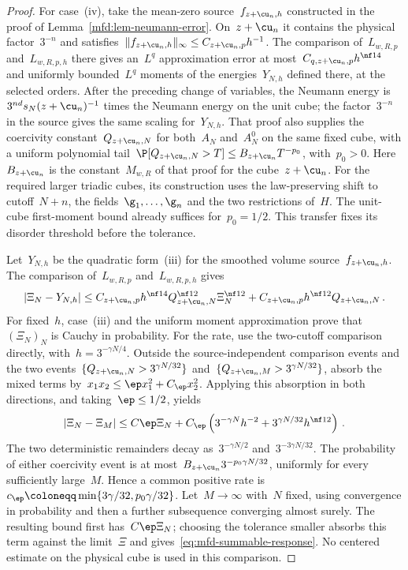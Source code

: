 \documentclass[11pt]{amsart}
\begin{document}
\begin{proof}
For case~(iv), take the mean-zero source~$f_{z+\cu_n,h}$ constructed in the proof of Lemma~\ref{mfd:lem-neumann-error}. On~$z+\cu_n$ it contains the physical factor~$3^{-n}$ and satisfies~$\|f_{z+\cu_n,h}\|_\infty\leq C_{z+\cu_n,p}h^{-1}$. The comparison of~$L_{w,R,p}$ and~$L_{w,R,p,h}$ there gives an~$L^q$ approximation error at most~$C_{q,z+\cu_n,p}h^{\nf14}$ and uniformly bounded~$L^q$ moments of the energies~$Y_{N,h}$ defined there, at the selected orders. After the preceding change of variables, the Neumann energy is~$3^{nd}s_N(z+\cu_n)^{-1}$ times the Neumann energy on the unit cube; the factor~$3^{-n}$ in the source gives the same scaling for~$Y_{N,h}$. That proof also supplies the coercivity constant~$Q_{z+\cu_n,N}$ for both~$A_N$ and~$A_N^0$ on the same fixed cube, with a uniform polynomial tail~$\P[Q_{z+\cu_n,N}>T]\leq B_{z+\cu_n}T^{-p_0}$, with~$p_0>0$. Here~$B_{z+\cu_n}$ is the constant~$M_{w,R}$ of that proof for the cube~$z+\cu_n$. For the required larger triadic cubes, its construction uses the law-preserving shift to cutoff~$N+n$, the fields~$\g_1,\dots,\g_n$ and the two restrictions of~$H$. The unit-cube first-moment bound already suffices for~$p_0=1/2$. This transfer fixes its disorder threshold before the tolerance.

\smallskip

Let~$Y_{N,h}$ be the quadratic form~(iii) for the smoothed volume source~$f_{z+\cu_n,h}$. The comparison of~$L_{w,R,p}$ and~$L_{w,R,p,h}$ gives
\begin{equation*}
	|\Xi_N-Y_{N,h}|
	\leq C_{z+\cu_n,p}h^{\nf14}Q_{z+\cu_n,N}^{\nf12}\Xi_N^{\nf12}
	+C_{z+\cu_n,p}h^{\nf12}Q_{z+\cu_n,N}\,.
\end{equation*}
For fixed~$h$, case~(iii) and the uniform moment approximation prove that~$(\Xi_N)_N$ is Cauchy in probability. For the rate, use the two-cutoff comparison directly, with~$h=3^{-\gamma N/4}$. Outside the source-independent comparison events and the two events~$\{Q_{z+\cu_n,N}>3^{\gamma N/32}\}$ and~$\{Q_{z+\cu_n,M}>3^{\gamma N/32}\}$, absorb the mixed terms by~$x_1x_2\leq\ep x_1^2+C_\ep x_2^2$. Applying this absorption in both directions, and taking~$\ep\leq1/2$, yields
\begin{equation*}
	|\Xi_N-\Xi_M|
	\leq C\ep \Xi_N+
	C_\ep
	\left(3^{-\gamma N}h^{-2}+3^{\gamma N/32}h^{\nf12}\right)\,.
\end{equation*}
The two deterministic remainders decay as~$3^{-\gamma N/2}$ and~$3^{-3\gamma N/32}$. The probability of either coercivity event is at most~$B_{z+\cu_n}3^{-p_0\gamma N/32}$, uniformly for every sufficiently large~$M$. Hence a common positive rate is~$c_\ep\coloneqq\min\{3\gamma/32,p_0\gamma/32\}$. Let~$M\to\infty$ with~$N$ fixed, using convergence in probability and then a further subsequence converging almost surely. The resulting bound first has~$C\ep \Xi_N$; choosing the tolerance smaller absorbs this term against the limit~$\Xi$ and gives~\eqref{eq:mfd-summable-response}. No centered estimate on the physical cube is used in this comparison.


\end{proof}
\end{document}
